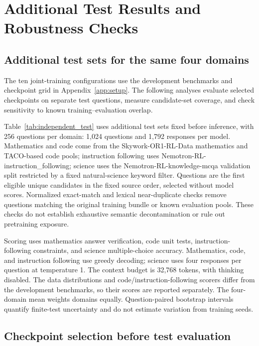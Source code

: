 \section{Additional Test Results and Robustness Checks}
\label{app:completed_results}

\subsection{Additional test sets for the same four domains}
\label{app:independent_domain_test}

The ten joint-training configurations use the development benchmarks and checkpoint grid in Appendix~\ref{app:setup}. The following analyses evaluate selected checkpoints on separate test questions, measure candidate-set coverage, and check sensitivity to known training--evaluation overlap.

Table~\ref{tab:independent_test} uses additional test sets fixed before inference, with 256 questions per domain: 1,024 questions and 1,792 responses per model. Mathematics and code come from the Skywork-OR1-RL-Data mathematics and TACO-based code pools; instruction following uses Nemotron-RL-instruction\_following; science uses the Nemotron-RL-knowledge-mcqa validation split restricted by a fixed natural-science keyword filter. Questions are the first eligible unique candidates in the fixed source order, selected without model scores. Normalized exact-match and lexical near-duplicate checks remove questions matching the original training bundle or known evaluation pools. These checks do not establish exhaustive semantic decontamination or rule out pretraining exposure.

Scoring uses mathematics answer verification, code unit tests, instruction-following constraints, and science multiple-choice accuracy. Mathematics, code, and instruction following use greedy decoding; science uses four responses per question at temperature 1. The context budget is 32,768 tokens, with thinking disabled. The data distributions and code/instruction-following scorers differ from the development benchmarks, so their scores are reported separately. The four-domain mean weights domains equally. Question-paired bootstrap intervals quantify finite-test uncertainty and do not estimate variation from training seeds.



\subsection{Checkpoint selection before test evaluation}
\label{app:completed_selection}

